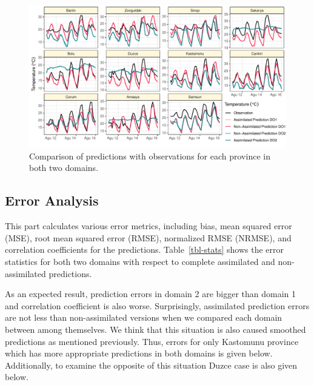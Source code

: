 \documentclass[
  letterpaper,
  DIV=11,
  numbers=noendperiod,
  abstract]{scrartcl}
\begin{document}
\begin{figure}[H]

{\centering \includegraphics{WRF_pdf_files/figure-pdf/fig-do1-2-1.pdf}

}

\caption{\label{fig-do1-2}Comparison of predictions with observations
for each province in both two domains.}

\end{figure}

\hypertarget{error-analysis}{%
\subsection{Error Analysis}\label{error-analysis}}

This part calculates various error metrics, including bias, mean squared
error (MSE), root mean squared error (RMSE), normalized RMSE (NRMSE),
and correlation coefficients for the predictions. Table~\ref{tbl-stats}
shows the error statistics for both two domains with respect to complete
assimilated and non-assimilated predictions.

As an expected result, prediction errors in domain 2 are bigger than
domain 1 and correlation coefficient is also worse. Surprisingly,
assimilated prediction errors are not less than non-assimilated versions
when we compared each domain between among themselves. We think that
this situation is also caused smoothed predictions as mentioned
previously. Thus, errors for only Kastomunu province which has more
appropriate predictions in both domains is given below. Additionally, to
examine the opposite of this situation Duzce case is also given below.
\end{document}
